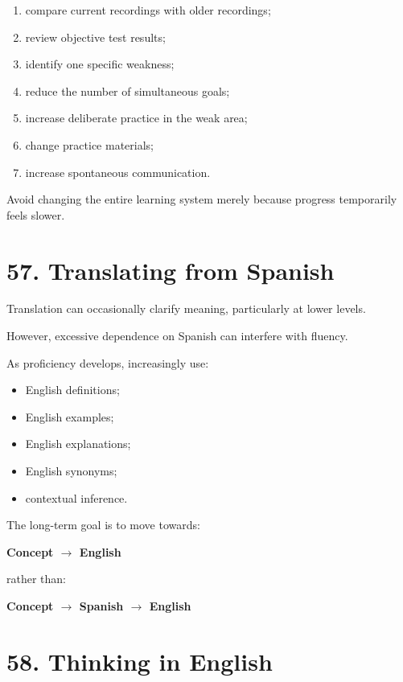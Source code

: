 \begin{enumerate}
    \item compare current recordings with older recordings;
    \item review objective test results;
    \item identify one specific weakness;
    \item reduce the number of simultaneous goals;
    \item increase deliberate practice in the weak area;
    \item change practice materials;
    \item increase spontaneous communication.
\end{enumerate}

Avoid changing the entire learning system merely because progress temporarily feels slower.

\section*{57. Translating from Spanish}

Translation can occasionally clarify meaning, particularly at lower levels.

However, excessive dependence on Spanish can interfere with fluency.

As proficiency develops, increasingly use:

\begin{itemize}
    \item English definitions;
    \item English examples;
    \item English explanations;
    \item English synonyms;
    \item contextual inference.
\end{itemize}

The long-term goal is to move towards:

\begin{center}
\textbf{Concept $\rightarrow$ English}
\end{center}

rather than:

\begin{center}
\textbf{Concept $\rightarrow$ Spanish $\rightarrow$ English}
\end{center}

\section*{58. Thinking in English}

